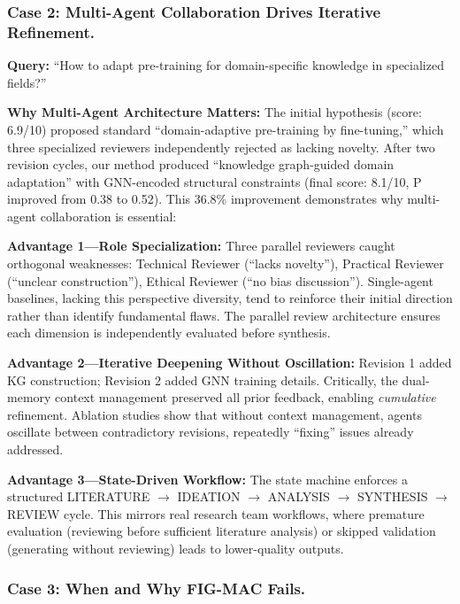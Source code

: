 \documentclass[runningheads]{llncs}
\begin{document}
\subsubsection{Case 2: Multi-Agent Collaboration Drives Iterative Refinement.}
\label{sec:case2}

\textbf{Query:} ``How to adapt pre-training for domain-specific knowledge in specialized fields?''

\textbf{Why Multi-Agent Architecture Matters:} The initial hypothesis (score: 6.9/10) proposed standard ``domain-adaptive pre-training by fine-tuning,'' which three specialized reviewers independently rejected as lacking novelty. After two revision cycles, our method produced ``knowledge graph-guided domain adaptation'' with GNN-encoded structural constraints (final score: 8.1/10, P improved from 0.38 to 0.52). This 36.8\% improvement demonstrates why multi-agent collaboration is essential:

\textbf{Advantage 1---Role Specialization:} Three parallel reviewers caught orthogonal weaknesses: Technical Reviewer (``lacks novelty''), Practical Reviewer (``unclear construction''), Ethical Reviewer (``no bias discussion''). Single-agent baselines, lacking this perspective diversity, tend to reinforce their initial direction rather than identify fundamental flaws. The parallel review architecture ensures each dimension is independently evaluated before synthesis.

\textbf{Advantage 2---Iterative Deepening Without Oscillation:} Revision 1 added KG construction; Revision 2 added GNN training details. Critically, the dual-memory context management preserved all prior feedback, enabling \emph{cumulative} refinement. Ablation studies show that without context management, agents oscillate between contradictory revisions, repeatedly ``fixing'' issues already addressed.

\textbf{Advantage 3---State-Driven Workflow:} The state machine enforces a structured LITERATURE $\rightarrow$ IDEATION $\rightarrow$ ANALYSIS $\rightarrow$ SYNTHESIS $\rightarrow$ REVIEW cycle. This mirrors real research team workflows, where premature evaluation (reviewing before sufficient literature analysis) or skipped validation (generating without reviewing) leads to lower-quality outputs.

\subsubsection{Case 3: When and Why FIG-MAC Fails.}
\label{sec:case3}
\end{document}
